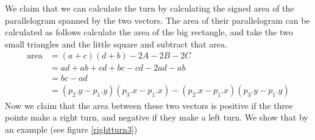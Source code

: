 We claim that we can calculate the turn by calculating the signed area of the
parallelogram spanned by the two vectors. The area of their parallelogram can
be calculated as follows calculate the area of the big rectangle, and take the
two small triangles and the little square and subtract that area.
\begin{align}
	\text{area} &= (a+c)(d+b)-2A-2B-2C\nonumber\\
							&=ad+ab+cd+bc-cd-2ad-ab\nonumber\\
							&=bc-ad \nonumber\\
							&=(p_2.y-p_1.y)(p_3.x-p_1.x)-(p_2.x-p_1.x)(p_3.y-p_1.y)\label{form:rightturn}
\end{align}
Now we claim that the area between these two vectors is positive if the
three points make a right turn, and negative if they make a left turn. We show
that by an example (see figure \ref{rightturn3})

